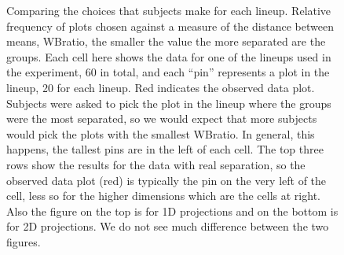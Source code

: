 \begin{figure}[hbtp]
       \caption{Comparing the choices that subjects make for each lineup. Relative frequency of plots chosen against a measure of the distance between means, WBratio, the smaller the value the more separated are the groups. Each cell here shows the data for one of the lineups used in the experiment, 60 in total, and each ``pin'' represents a plot in the lineup, 20 for each lineup. Red indicates the observed data plot. Subjects were asked to pick the plot in the lineup where the groups were the most separated, so we would expect that more subjects would pick the plots with the smallest WBratio. In general, this happens, the tallest pins are in the left of each cell. The top three rows show the results for the data with real separation, so the observed data plot (red) is typically the pin on the very left of the cell, less so for the higher dimensions which are the cells at right. Also the figure on the top is for 1D projections and on the bottom is for 2D projections. We do not see much difference between the two figures.
       }
       \label{wbratio}
\end{figure}





